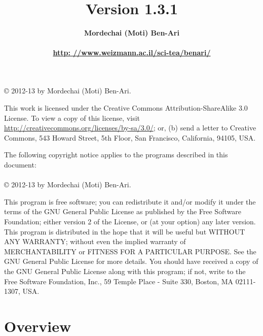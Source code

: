 \documentclass[11pt]{report}
\title{\bfseries \ls\\\mbox{}\\\mbox{}\\
\bfseries\normalsize Version 1.3.1}
\author{\bfseries Mordechai (Moti) Ben-Ari\\\mbox{}\\
\url{http: //www.weizmann.ac.il/sci-tea/benari/}}
\begin{document}
\maketitle

\thispagestyle{empty}

\vspace*{\fill}

\begin{center}
\copyright{} 2012-13 by Mordechai (Moti) Ben-Ari.
\end{center}
This work is licensed under the Creative Commons Attribution-ShareAlike 3.0
License. To view a copy of this license, visit
\url{http://creativecommons.org/licenses/by-sa/3.0/}; or, (b) send a letter
to Creative Commons, 543 Howard Street, 5th Floor, San Francisco,
California, 94105, USA.

\bigskip\bigskip

 
\begin{center}
The following copyright notice applies to the programs described in this
document:\mbox{}\\\mbox{}\\
\copyright{} 2012-13 by Mordechai (Moti) Ben-Ari.
\end{center}

This program is free software; you can redistribute it and/or
modify it under the terms of the GNU General Public License
as published by the Free Software Foundation; either version 2
of the License, or (at your option) any later version.
This program is distributed in the hope that it will be useful
but WITHOUT ANY WARRANTY; without even the implied warranty of
MERCHANTABILITY or FITNESS FOR A PARTICULAR PURPOSE.
See the GNU General Public License for more details.
You should have received a copy of the GNU General Public License
along with this program; if not, write to the Free Software
Foundation, Inc., 59 Temple Place - Suite 330, Boston, MA
02111-1307, USA.

\vspace*{\fill}

\setcounter{tocdepth}{1}
\tableofcontents

\thispagestyle{empty}

\setcounter{page}{0}

\newpage


\section*{Overview}
\end{document}
